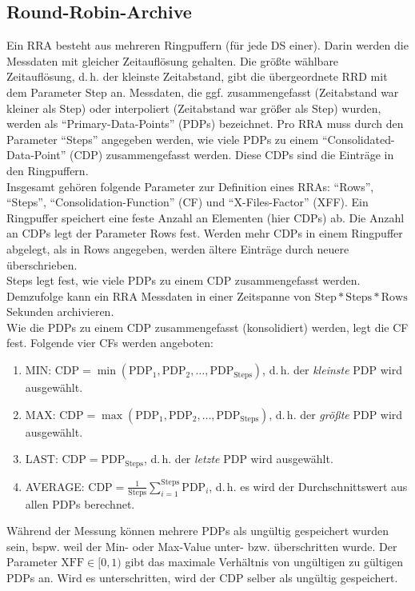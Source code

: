 \documentclass[12pt,ngerman,toc=listofnumbered,toc=bibliographynumbered,toc=index,headsepline=true]{scrbook}
\begin{document}
\subsection{Round-Robin-Archive}
Ein RRA besteht aus mehreren Ringpuffern (für jede DS einer). Darin werden die
Messdaten mit gleicher Zeitauflösung gehalten. Die größte wählbare
Zeitauflösung, d.\,h. der kleinste Zeitabstand, gibt die übergeordnete RRD
mit dem Parameter Step an. Messdaten, die ggf. zusammengefasst (Zeitabstand war
kleiner als Step) oder interpoliert (Zeitabstand war größer als Step) wurden,
werden als \enquote{Primary-Data-Points} (PDPs) bezeichnet. Pro RRA muss durch
den Parameter \enquote{Steps} angegeben werden, wie viele PDPs zu einem
\enquote{Consolidated-Data-Point} (CDP) zusammengefasst werden. Diese CDPs sind
die Einträge in den Ringpuffern.\\
Insgesamt gehören folgende Parameter zur Definition eines RRAs: \enquote{Rows}, \\
\enquote{Steps}, \enquote{Consolidation-Function} (CF) und
\enquote{X-Files-Factor} (XFF).
Ein Ringpuffer speichert eine feste Anzahl an Elementen (hier CDPs) ab. Die
Anzahl an CDPs legt der Parameter Rows fest. Werden mehr CDPs in einem
Ringpuffer abgelegt, als in Rows angegeben, werden ältere Einträge durch neuere
überschrieben.\\
Steps legt fest, wie viele PDPs zu einem CDP zusammengefasst werden. Demzufolge
kann ein RRA Messdaten in einer Zeitspanne von
$\text{Step}*\text{Steps}*\text{Rows}$ Sekunden archivieren.\\
Wie die PDPs zu einem CDP zusammengefasst (konsolidiert) werden, legt die CF
fest. Folgende vier CFs werden angeboten:
\begin{enumerate}
  \item MIN: $\text{CDP} = \min(\text{PDP}_1, \text{PDP}_2, \ldots,
  \text{PDP}_{\text{Steps}})$, d.\,h. der \textit{kleinste} PDP wird ausgewählt.
  \item MAX: $\text{CDP} = \max(\text{PDP}_1, \text{PDP}_2, \ldots,
  \text{PDP}_{\text{Steps}})$, d.\,h. der \textit{größte} PDP wird ausgewählt.
  \item LAST: $\text{CDP} = \text{PDP}_{\text{Steps}}$, d.\,h. der
  \textit{letzte} PDP wird ausgewählt.
  \item AVERAGE: $\text{CDP} =
  \frac{1}{\text{Steps}}\sum\limits_{i=1}^\text{Steps} \text{PDP}_i$, d.\,h. es
  wird der Durchschnittswert aus allen PDPs berechnet.
\end{enumerate}
Während der Messung können mehrere PDPs als ungültig gespeichert wurden sein,
bspw. weil der Min- oder Max-Value unter- bzw. überschritten wurde. Der
Parameter $\text{XFF} \in [0, 1)$ gibt das maximale Verhältnis von ungültigen zu
gültigen PDPs an. Wird es unterschritten, wird der CDP selber als ungültig
gespeichert.
\end{document}
